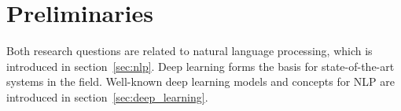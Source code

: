 \clearemptydoublepage

\chapter{Preliminaries}
\label{ch:preliminaries}

Both research questions are related to natural language processing, which is introduced in section~\ref{sec:nlp}.
Deep learning forms the basis for state-of-the-art systems in the field.
Well-known deep learning models and concepts for NLP are introduced in section~\ref{sec:deep_learning}.




